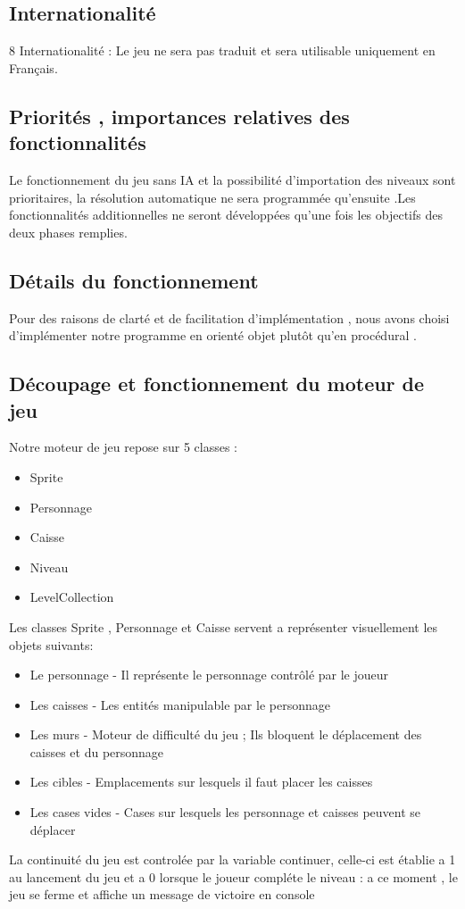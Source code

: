 \documentclass{article}
\begin{document}
		\subsection{Internationalité}
		8 Internationalité :
Le jeu ne sera pas traduit et sera utilisable uniquement en Français.
		\subsection{Priorités , importances relatives des fonctionnalités}
		Le fonctionnement du jeu sans IA et la possibilité d’importation des niveaux
sont prioritaires, la résolution automatique ne sera programmée qu’ensuite .Les
fonctionnalités additionnelles ne seront développées qu’une fois les objectifs des
deux phases remplies.
	\newpage
	\begin{center}
	\section{Détails du fonctionnement}
		\vspace{0.5cm}
		Pour des raisons de clarté et de facilitation d'implémentation , nous avons choisi d'implémenter notre programme en orienté objet plutôt qu'en procédural .
		\end{center}
		\vspace{0.5cm}
		\subsection{Découpage et fonctionnement du moteur de jeu}
		
			Notre moteur de jeu repose sur 5 classes :
			\begin{itemize}
				\item Sprite 
				\item Personnage 
				\item Caisse
				\item Niveau
				\item LevelCollection
				\end{itemize}
				\vspace{0.5cm}
			Les classes Sprite , Personnage et Caisse servent a représenter visuellement les objets suivants:
				\begin{itemize}
					\item Le personnage - Il représente le personnage contrôlé par le joueur
					\item Les caisses - Les entités manipulable par le personnage
					\item Les murs - Moteur de difficulté du jeu ; Ils bloquent le déplacement des caisses et du personnage
					\item Les cibles - Emplacements sur lesquels il faut placer les caisses
					\item Les cases vides - Cases sur lesquels les personnage et caisses peuvent se déplacer
				\end{itemize}
				\vspace{0.5cm}
				La continuité du jeu est controlée par la variable continuer, celle-ci est établie a 1 au lancement du jeu et a 0 lorsque le joueur compléte le niveau : a ce moment , le jeu se ferme et affiche un message de victoire en console
				
\end{document}
